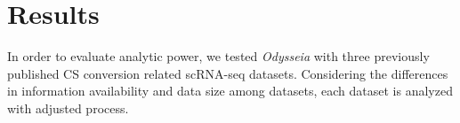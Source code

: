 \documentclass[fleqn,10pt]{wlscirep}
\begin{document}
%

\section*{Results}
\label{res}
In order to evaluate analytic power, we tested \emph{Odysseia} with three previously published CS conversion related scRNA-seq datasets.
Considering the differences in information availability and data size among datasets, each dataset is analyzed with adjusted process.
\end{document}
